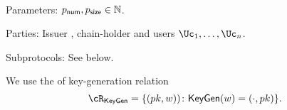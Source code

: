 \begin{protocol}~\label{prot:ConfidentialTransactions}

	\item[Parameters:] $p_{\mathsf{num}},p_{\mathsf{size}} \in {\mathbb{N}}$.
	
\item[Parties:] Issuer \Ic, chain-holder \Cc and users  $\Uc_1, \ldots,\Uc_n$.


\item[Subprotocols:]  See below.
\end{protocol}


\newcommand{\rKeyGen}{{\cR_{\sf KeyGen}}}

\newcommand{\rKeyGenDef}
{
	 \set{(pk,w))\colon \KeyGen(w)= (\cdot,pk)}
}


We use the   of  key-generation relation  
$$\rKeyGen =\rKeyGenDef.$$

